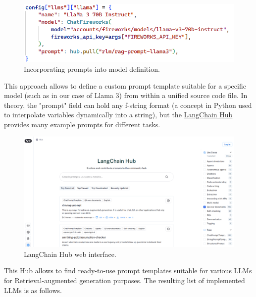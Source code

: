 \begin{figure}[htbp]
    \centering
    \includegraphics[width=\linewidth]{./figures/prompt-template-impl.png}
    \caption{Incorporating prompts into model definition.}
\end{figure}\newline
This approach allows to define a custom prompt template suitable for a specific model (such as in our case of Llama 3) from within a unified source code file. In theory, the "prompt" field can hold any f-string format (a concept in Python used to interpolate variables dynamically into a string), but the \href{https://smith.langchain.com/hub}{LangChain Hub} provides many example prompts for different tasks.
\begin{figure}[htbp]
    \centering
    \includegraphics[width=\linewidth]{./figures/langchain-hub.png}
    \caption{LangChain Hub web interface.}
\end{figure}\newline
This Hub allows to find ready-to-use prompt templates suitable for various LLMs for Retrieval-augmented generation purposes.\medskip\newline
The resulting list of implemented LLMs is as follows.
